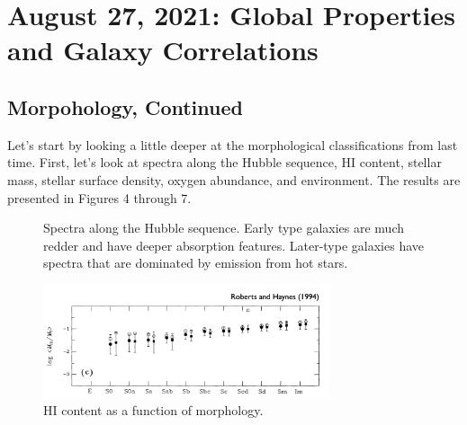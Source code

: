 \documentclass{article}
\begin{document}
\section{August 27, 2021: Global Properties and Galaxy Correlations}

\subsection{Morpohology, Continued}

Let's start by looking a little deeper at the morphological classifications from last time. First, let's look at spectra along the Hubble sequence, HI content, stellar mass, stellar surface density, oxygen abundance, and environment. The results are presented in Figures 4 through 7.

\begin{figure}%
    \centering
    \qquad
    \caption{Spectra along the Hubble sequence. Early type galaxies are much redder and have deeper absorption features. Later-type galaxies have spectra that are dominated by emission from hot stars. }%
    \label{fig:spec_types}%
\end{figure}

\begin{figure}[ht!]
    \centering
    \includegraphics[width=0.75\textwidth]{figs/Screen Shot 2021-08-27 at 1.44.29 PM.png}
    \caption{HI content as a function of morphology.}
    \label{fig:HI_conte}
\end{figure}
\end{document}
